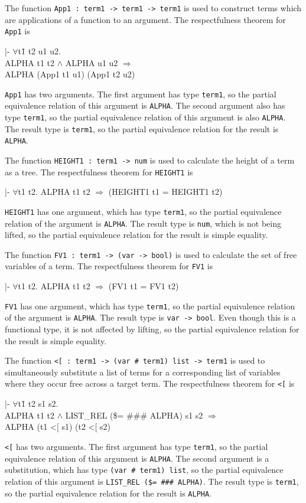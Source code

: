 \documentclass[envcountsame,runningheads]{llncs}
\newcommand{\quotient}{partial equivalence}
\begin{document}
The function {\tt App1 : term1 -> term1 -> term1}
is used to construct terms which are applications of a function to an argument.
The respectfulness theorem for {\tt App1} is
{\tt \begin{tabbing}
\hspace{5.5mm}
    |- $\forall$t\=1 t2 u1 u2. \\
\>       ALPHA t1 t2 $\wedge$ ALPHA u1 u2 $\Rightarrow$\\
\>       ALPHA (App1 t1 u1) (App1 t2 u2)
\end{tabbing}}
{\tt App1} has two arguments.
The first argument has type {\tt term1},
so the \quotient{} relation of this argument is {\tt ALPHA}.
The second argument also has type {\tt term1},
so the \quotient{} relation of this argument is also {\tt ALPHA}.
The result type is {\tt term1}, so the \quotient{} relation for the
result is {\tt ALPHA}. 

The function {\tt HEIGHT1 : term1 -> num}
is used to calculate the height of a term as a tree.
The respectfulness theorem for {\tt HEIGHT1} is
{\tt \begin{tabbing}
\hspace{5.5mm}
    |- $\forall$t1 t2. ALPHA t1 t2 $\Rightarrow$ (HEIGHT1 t1 = HEIGHT1 t2)
\end{tabbing}}
{\tt HEIGHT1} has one argument, which
has type {\tt term1},
so the \quotient{} relation of the argument is {\tt ALPHA}.
The result type is {\tt num}, which is not being lifted,
so the \quotient{} relation for the result is simple equality. 

The function {\tt FV1 : term1 -> (var -> bool)}
is used to calculate the set of free variables of a term.
The respectfulness theorem for {\tt FV1} is
{\tt \begin{tabbing}
\hspace{5.5mm}
    |- $\forall$t1 t2. ALPHA t1 t2 $\Rightarrow$ (FV1 t1 = FV1 t2)
\end{tabbing}}
{\tt FV1} has one argument, which
has type {\tt term1},
so the \quotient{} relation of the argument is {\tt ALPHA}.
The result type is {\tt var -> bool}.
Even though this is a functional type,
it is not affected by lifting,
so the \quotient{} relation for the result is simple equality. 

The function {\tt <[ : term1 -> (var \# term1) list -> term1}
is used to simultaneously substitute a list of terms
for a corresponding list of variables
where they occur free across a target term.
The respectfulness theorem for {\tt <[} is
{\tt \begin{tabbing}
\hspace{5.5mm}
    |- $\forall$t\=1 t2 s1 s2. \\
\>       ALPHA t1 t2 $\wedge$ LIST\_REL (\$= \#\#\# ALPHA) s1 s2 $\Rightarrow$ \\
\>       ALPHA (t1 <[ s1) (t2 <[ s2)
\end{tabbing}}
{\tt <[} has two arguments.
The first argument has type {\tt term1},
so the \quotient{} relation of this argument is {\tt ALPHA}.
The second argument is a substitution, which has type {\tt (var \# term1) list},
so the \quotient{} relation of this argument is {\tt LIST\_REL (\$= \#\#\# ALPHA)}.
The result type is {\tt term1}, so the \quotient{} relation for the
result is {\tt ALPHA}. 
\end{document}
